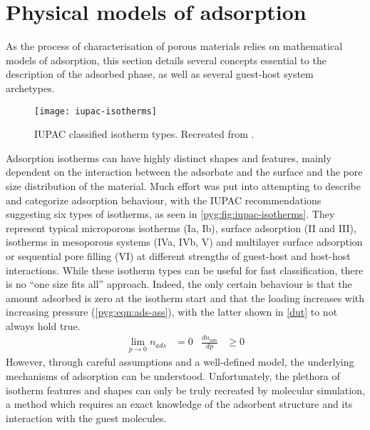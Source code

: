 
\section{Physical models of adsorption}%
\label{pyg:models}

As the process of characterisation of porous materials
relies on mathematical models of adsorption, this section 
details several concepts essential to the description of the 
adsorbed phase, as well as several guest-host system archetypes.

\begin{figure}[htb]
	\centering
	\texttt{[image: iupac-isotherms]}
	\caption{
		\gls{IUPAC} classified isotherm types. 
		Recreated from \citet{thommesPhysisorptionGasesSpecial2015}.
	}\label{pyg:fig:iupac-isotherms}
\end{figure}

Adsorption isotherms can have highly distinct shapes and features,
mainly dependent on the interaction between the adsorbate and the surface
and the pore size distribution of the material.
Much effort was put into attempting to describe and categorize
adsorption behaviour, with the \gls{IUPAC} recommendations suggesting
six types of isotherms, as seen in \autoref{pyg:fig:iupac-isotherms}.
They represent typical microporous isotherms (Ia, Ib), surface adsorption
(II and III), isotherms in mesoporous systems (IVa, IVb, V) and 
multilayer surface adsorption or sequential pore filling (VI)
at different strengths of guest-host and host-host interactions.
While these isotherm types can be useful for fast classification, 
there is no ``one size fits all'' approach. Indeed, the only 
certain behaviour is that the amount adsorbed is zero at
the isotherm start and that the loading increases with increasing
pressure (\autoref{pyg:eqn:ads-ass}), with the latter shown in 
\autoref{dut} to not always hold true. 
\begin{align}\label{pyg:eqn:ads-ass}
	\lim_{p \to 0} n_{ads} & = 0 & \frac{dn_{ads}}{dp} & \geqslant 0
\end{align}
However, through careful assumptions and a well-defined
model, the underlying mechanisms of adsorption can be understood.
Unfortunately, the plethora of isotherm features and shapes can only
be truly recreated by molecular simulation, a method which requires an
exact knowledge of the adsorbent structure and its interaction
with the guest molecules.


